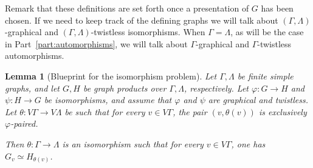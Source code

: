 \documentclass[a4paper,english,11pt]{article}
\newtheorem{lemma}[de]{Lemma}
\theoremstyle{definition}
\theoremstyle{remark}
\begin{document}
Remark that these definitions are set forth once a presentation of $G$ has been chosen. If we need to keep track of the defining graphs we will talk about $(\Gamma,\Lambda)$-graphical and $(\Gamma,\Lambda)$-twistless isomorphisms. When $\Gamma=\Lambda$, as will be the case in Part~\ref{part:automorphisms}, we will talk about $\Gamma$-graphical and $\Gamma$-twistless automorphisms.

\begin{lemma}[Blueprint for the isomorphism problem]\label{lemma:blueprint}
Let $\Gamma,\Lambda$ be finite simple graphs, and let $G,H$ be graph products over $\Gamma,\Lambda$, respectively. Let $\varphi:G\to H$ and $\psi:H\to G$ be isomorphisms, and assume that $\varphi$ and $\psi$ are graphical and twistless. Let $\theta:V\Gamma\to V\Lambda$ be such that for every $v\in V\Gamma$, the pair $(v,\theta(v))$ is exclusively $\varphi$-paired.

Then $\theta:\Gamma\to\Lambda$ is an isomorphism such that for every $v\in V\Gamma$, one has $G_v\simeq H_{\theta(v)}$.
\end{lemma}
\end{document}
